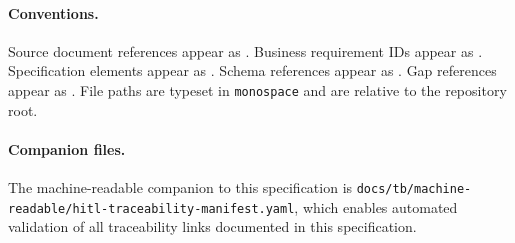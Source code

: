 \paragraph{Conventions.} Source document references appear as
. Business requirement IDs appear as .
Specification elements appear as . Schema references
appear as . Gap references appear as
. File paths are typeset in \texttt{monospace} and are
relative to the repository root.

\paragraph{Companion files.} The machine-readable companion to this
specification is \texttt{docs/tb/machine-readable/hitl-traceability-manifest.yaml},
which enables automated validation of all traceability links documented
in this specification.

\tableofcontents